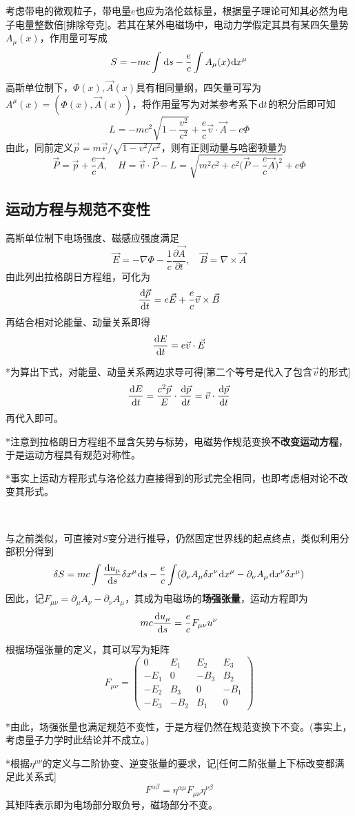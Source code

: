 \documentclass[a4paper,UTF8,fontset=windows]{ctexart}
\newcommand*{\dr}{\hspace{0.07em}\mathrm{d}}
\newcommand*{\va}{\vec{A}}
\newcommand*{\vb}{\vec{B}}
\newcommand*{\ve}{\vec{E}}
\newcommand*{\vp}{\vec{P}}
\newcommand*{\vps}{\vec{p}}
\newcommand*{\vvs}{\vec{v}}
\newcommand*{\dt}[2][t]{\frac{\dr #2}{\dr #1}}
\newcommand*{\pt}[2][t]{\frac{\partial #2}{\partial #1}}
\begin{document}
考虑带电的微观粒子，带电量$e$也应为洛伦兹标量，根据量子理论可知其必然为电子电量整数倍[排除夸克]。若其在某外电磁场中，电动力学假定其具有某四矢量势$A_\mu(x)$，作用量可写成
$$S=-mc\int\dr s-\frac{e}{c}\int A_\mu(x)\dr x^\mu$$
高斯单位制下，$\Phi(x),\va(x)$具有相同量纲，四矢量可写为$A^\mu(x)=(\Phi(x),\va(x))$，将作用量写为对某参考系下$\dr t$的积分后即可知
$$L=-mc^2\sqrt{1-\frac{v^2}{c^2}}+\frac{e}{c}\vvs\cdot\va-e\Phi$$
由此，同前定义$\vps=m\vvs/\sqrt{1-v^2/c^2}$，则有正则动量与哈密顿量为
$$\vp=\vps+\frac{e}{c}\va,\quad H=\vvs\cdot\vp-L=\sqrt{m^2c^2+c^2\bigg(\vp-\frac{e}{c}\va\bigg)^2}+e\Phi$$

\subsection{运动方程与规范不变性}
高斯单位制下电场强度、磁感应强度满足
$$\ve=-\nabla\Phi-\frac{1}{c}\pt{\va},\quad\vb=\nabla\times\va$$
由此列出拉格朗日方程组，可化为
$$\dt{\vps}=e\ve+\frac{e}{c}\vvs\times\vb$$
再结合相对论能量、动量关系即得
$$\dt{E}=e\vvs\cdot\ve$$

*为算出下式，对能量、动量关系两边求导可得[第二个等号是代入了包含$\vvs$的形式]
$$\dt{E}=\frac{c^2\vps}{E}\cdot\dt{\vps}=\vvs\cdot\dt{\vps}$$
再代入即可。

*注意到拉格朗日方程组不显含矢势与标势，电磁势作规范变换\textbf{不改变运动方程}，于是运动方程具有规范对称性。

*事实上运动方程形式与洛伦兹力直接得到的形式完全相同，也即考虑相对论不改变其形式。

\

与之前类似，可直接对$S$变分进行推导，仍然固定世界线的起点终点，类似利用分部积分得到
$$\delta S=mc\int\dt[s]{u_\mu}\delta x^\mu\dr s-\frac{e}{c}\int(\partial_\nu A_\mu\delta x^\nu\dr x^\mu-\partial_\nu A_\mu\dr x^\nu\delta x^\mu)$$
因此，记$F_{\mu\nu}=\partial_\mu A_\nu-\partial_\nu A_\mu$，其成为电磁场的\textbf{场强张量}，运动方程即为
$$mc\dt[s]{u_\mu}=\frac{e}{c}F_{\mu\nu}u^\nu$$

根据场强张量的定义，其可以写为矩阵
$$F_{\mu\nu}=\begin{pmatrix}0&E_1&E_2&E_3\\-E_1&0&-B_3&B_2\\-E_2&B_3&0&-B_1\\-E_3&-B_2&B_1&0\end{pmatrix}$$

*由此，场强张量也满足规范不变性，于是方程仍然在规范变换下不变。(事实上，考虑量子力学时此结论并不成立。)

*根据$\eta^{\mu\nu}$的定义与二阶协变、逆变张量的要求，记[任何二阶张量上下标改变都满足此关系式]
$$F^{\alpha\beta}=\eta^{\alpha\mu}F_{\mu\nu}\eta^{\nu\beta}$$
其矩阵表示即为电场部分取负号，磁场部分不变。
\end{document}

